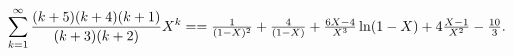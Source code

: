 \begin{equation}\label{sum} \sum_{k=1}^{\infty}{(k+5)(k+4)(k+1)\over (k+3)(k+2)}X^{k}= $$ $$
={1\over (1-X)^{2}}+{4\over (1-X)}+ {6X-4\over X^{3}}\ln
(1-X)+4{X-1\over X^{2}}-{10\over 3}.
\end{equation}

